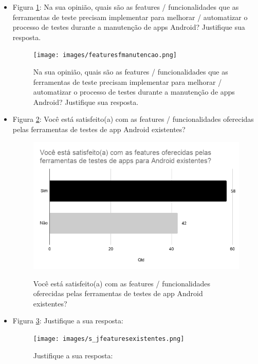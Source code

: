\begin{itemize}
    \item Figura \ref{figure:s_featuresfmanutencao}: Na sua opinião, quais são as features / funcionalidades que as ferramentas de teste precisam implementar para melhorar / automatizar o processo de testes  durante a manutenção de apps Android? Justifique sua resposta.
    \begin{figure}[!htb]
    \centering
    \texttt{[image: images/featuresfmanutencao.png]}
    \label{figure:s_featuresfmanutencao}
    \caption{Na sua opinião, quais são as features / funcionalidades que as ferramentas de teste precisam implementar para melhorar / automatizar o processo de testes  durante a manutenção de apps Android? Justifique sua resposta.}
    \end{figure}   
    
    
    \item Figura \ref{figure:s_featuresexistentes}: Você está satisfeito(a) com as features  / funcionalidades oferecidas pelas ferramentas de testes de app Android existentes?
    \begin{figure}[!htb]
    \centering
    \includegraphics[width=.80\textwidth]{images/s_featuresexistentes.png}
    \label{figure:s_featuresexistentes}
    \caption{Você está satisfeito(a) com as features  / funcionalidades oferecidas pelas ferramentas de testes de app Android existentes?}
    \end{figure}


    \item Figura \ref{figure:s_jfeaturesexistentes}: Justifique a sua resposta:
    \begin{figure}[!htb]
    \centering
    \texttt{[image: images/s\_jfeaturesexistentes.png]}
    \label{figure:s_jfeaturesexistentes}
    \caption{Justifique a sua resposta:}
    \end{figure}   
    
    
\end{itemize}
















